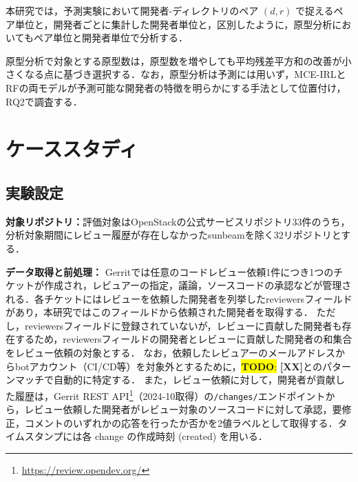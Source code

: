 \documentclass[submit,noauthor,ses,dvipdfmx]{ipsj}
\newcommand{\todo}[1]{\colorbox{yellow}{{\bf TODO}:}{\color{red} {\textbf{[#1]}}}}
\begin{document}
本研究では，予測実験において開発者-ディレクトリのペア $(d, r)$ で捉えるペア単位と，開発者ごとに集計した開発者単位と，区別したように，原型分析においてもペア単位と開発者単位で分析する．

原型分析で対象とする原型数は，原型数を増やしても平均残差平方和の改善が小さくなる点に基づき選択する．なお，原型分析は予測には用いず，MCE-IRLとRFの両モデルが予測可能な開発者の特徴を明らかにする手法として位置付け，RQ2で調査する．




\section{ケーススタディ}\label{sec:case}

\subsection{実験設定}

\noindent\textbf{対象リポジトリ：}評価対象はOpenStackの公式サービスリポジトリ33件のうち，分析対象期間にレビュー履歴が存在しなかったsunbeamを除く32リポジトリとする．

\noindent\textbf{データ取得と前処理：}
Gerritでは任意のコードレビュー依頼1件につき1つのチケットが作成され，レビュアーの指定，議論，ソースコードの承認などが管理される．各チケットにはレビューを依頼した開発者を列挙したreviewersフィールドがあり，本研究ではこのフィールドから依頼された開発者を取得する．
ただし，reviewersフィールドに登録されていないが，レビューに貢献した開発者も存在するため，reviewersフィールドの開発者とレビューに貢献した開発者の和集合をレビュー依頼の対象とする．
なお，依頼したレビュアーのメールアドレスからbotアカウント（CI/CD等）を対象外とするために，\todo{XX}とのパターンマッチで自動的に特定する．
また，レビュー依頼に対して，開発者が貢献した履歴は，Gerrit REST API\footnote{\url{https://review.opendev.org/}}（2024-10取得）の\texttt{/changes/}エンドポイントから，レビュー依頼した開発者がレビュー対象のソースコードに対して承認，要修正，コメントのいずれかの応答を行ったか否かを2値ラベルとして取得する．タイムスタンプには各 change の作成時刻 (created) を用いる．
\end{document}
